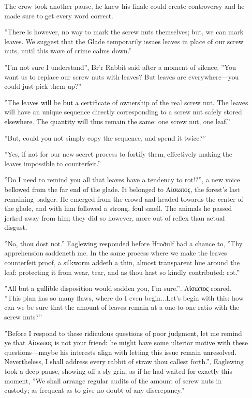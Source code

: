 The crow took another pause, he knew his finale could create controversy and he made sure to get every word correct. 

”There is however, no way to mark the screw nuts themselves; but, we can mark leaves. We suggest that the Glade temporarily issues leaves in place of our screw nuts, until this wave of crime calms down.”

”I'm not sure I understand”, Br'r Rabbit said after a moment of silence, ”You want us to replace our screw nuts with
leaves? But leaves are everywhere—you could just pick them up?”

”The leaves will be but a certificate of ownership of the real screw nut. The leaves will have an unique sequence directly corresponding to a screw nut safely stored elsewhere. The quantity will thus remain the same: one screw nut, one leaf.”

”But, could you not simply copy the sequence, and spend it twice?”

”Yes, if not for our new secret process to fortify them, effectively making the leaves impossible to counterfeit.”

”Do I need to remind you all that leaves have a tendency to rot!?”, a new voice bellowed from the far end of the glade. It belonged to Αίσωπος, the forest's last remaining badger. He emerged from the crowd and headed towards the center of the glade, and with him followed a strong, foul smell. The animals he passed jerked away from him; they did so however, more out of reflex than actual disgust.

”No, thou dost not.” Eaglewing responded before Hroðulf had a chance to, ”Thy apprehension saddeneth me. In the same process where we make the leaves counterfeit proof, a silkworm addeth a thin, almost transparent hue around the leaf: protecting it from wear, tear, and as thou hast so kindly contributed: rot.”

”All but a gullible disposition would sadden you, I'm sure.”, Αίσωπος roared, ”This plan has so many flaws, where do I even begin...Let's begin with this: how can we be sure that the amount of leaves remain at a one-to-one ratio with the screw nuts?”

”Before I respond to these ridiculous questions of poor judgment, let
me remind ye that Αίσωπος is not your friend: he might have some ulterior motive with these questions---maybe his interests align with letting this issue remain unresolved. Nevertheless, I shall address every rabbit of straw thou callest forth.”, Eaglewing took a deep pause, showing off a sly grin, as if he had waited for exactly this moment, ”We shall arrange regular audits of the amount of screw nuts in custody; as frequent as to give no doubt of any discrepancy.”

